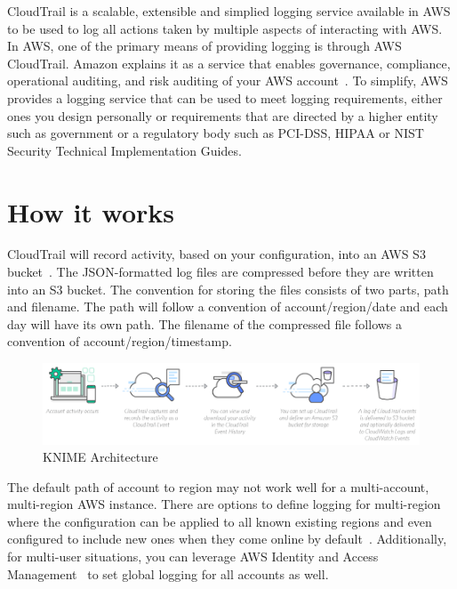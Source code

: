 CloudTrail is a scalable, extensible and simplied logging service available 
in AWS to be used to log all actions taken by multiple aspects of interacting
with AWS. In AWS, one of the primary means of providing logging is through AWS 
CloudTrail. Amazon explains it as a service that enables governance, 
compliance, operational auditing, and risk auditing of your AWS 
account~\cite{hid-sp18-518-CloudTrail-user-guide}. To simplify, AWS provides 
a logging service that can be used to meet logging requirements, either ones
you design personally or requirements that are directed by a higher entity 
such as government or a regulatory body such as PCI-DSS, HIPAA or NIST
Security Technical Implementation Guides.

\section{How it works}

CloudTrail will record activity, based on your configuration, into an 
AWS S3 bucket~\cite{hid-sp18-518-CloudTrail-log-example}.
The JSON-formatted log files are compressed before they are written into an 
S3 bucket. The convention for storing the files consists of two 
parts, path and filename. The path will follow a convention of 
account/region/date and each day will have its own path.  The filename of the 
compressed file follows a convention of account/region/timestamp. 

\begin{figure}[!ht]
	\centering\includegraphics[width=\columnwidth]{../images/Cloudtrail-How-it-works.png}
	\caption{KNIME Architecture~\cite{hid-sp18-518-CloudTrail-CloudFormation-Image}}
 	\label{fig:CloudTrail}
\end{figure}

The default path of account to region may not work well for a multi-account, 
multi-region AWS instance. There are options to define logging for multi-region 
where the configuration can be applied to all known existing regions and even 
configured to include new ones when they come online by 
default~\cite{hid-sp18-518-CloudTrail-global-events}. Additionally, 
for multi-user situations, you can leverage AWS Identity and Access 
Management~\cite{hid-sp18-518-CloudTrail-IAM} to set global logging for all 
accounts as well.

